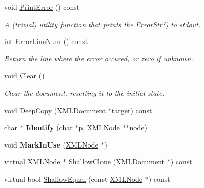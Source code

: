 \begin{DoxyCompactItemize}
\item 
\mbox{\label{classtinyxml2_1_1_x_m_l_document_a1d033945b42e125d933d6231e4571552}} 
void \mbox{\hyperlink{classtinyxml2_1_1_x_m_l_document_a1d033945b42e125d933d6231e4571552}{Print\+Error}} () const
\begin{DoxyCompactList}\small\item\em A (trivial) utility function that prints the \mbox{\hyperlink{classtinyxml2_1_1_x_m_l_document_ae97fff2402a0d01e0509c430b37996b3}{Error\+Str()}} to stdout. \end{DoxyCompactList}\item 
\mbox{\label{classtinyxml2_1_1_x_m_l_document_a57400f816dbe7799ece33615ead9ab76}} 
int \mbox{\hyperlink{classtinyxml2_1_1_x_m_l_document_a57400f816dbe7799ece33615ead9ab76}{Error\+Line\+Num}} () const
\begin{DoxyCompactList}\small\item\em Return the line where the error occured, or zero if unknown. \end{DoxyCompactList}\item 
\mbox{\label{classtinyxml2_1_1_x_m_l_document_a65656b0b2cbc822708eb351504178aaf}} 
void \mbox{\hyperlink{classtinyxml2_1_1_x_m_l_document_a65656b0b2cbc822708eb351504178aaf}{Clear}} ()
\begin{DoxyCompactList}\small\item\em Clear the document, resetting it to the initial state. \end{DoxyCompactList}\item 
void \mbox{\hyperlink{classtinyxml2_1_1_x_m_l_document_af592ffc91514e25a39664521ac83db45}{Deep\+Copy}} (\mbox{\hyperlink{classtinyxml2_1_1_x_m_l_document}{X\+M\+L\+Document}} $\ast$target) const
\item 
\mbox{\label{classtinyxml2_1_1_x_m_l_document_a25827d1bec509ad566a107e5853ed040}} 
char $\ast$ {\bfseries Identify} (char $\ast$p, \mbox{\hyperlink{classtinyxml2_1_1_x_m_l_node}{X\+M\+L\+Node}} $\ast$$\ast$node)
\item 
\mbox{\label{classtinyxml2_1_1_x_m_l_document_a95d28ecb4760a994556b0a51690b21be}} 
void {\bfseries Mark\+In\+Use} (\mbox{\hyperlink{classtinyxml2_1_1_x_m_l_node}{X\+M\+L\+Node}} $\ast$)
\item 
virtual \mbox{\hyperlink{classtinyxml2_1_1_x_m_l_node}{X\+M\+L\+Node}} $\ast$ \mbox{\hyperlink{classtinyxml2_1_1_x_m_l_document_aa37cc1709d7e1e988bc17dcfb24a69b8}{Shallow\+Clone}} (\mbox{\hyperlink{classtinyxml2_1_1_x_m_l_document}{X\+M\+L\+Document}} $\ast$) const
\item 
virtual bool \mbox{\hyperlink{classtinyxml2_1_1_x_m_l_document_a6fe5ef18699091844fcf64b56ffa5bf9}{Shallow\+Equal}} (const \mbox{\hyperlink{classtinyxml2_1_1_x_m_l_node}{X\+M\+L\+Node}} $\ast$) const
\end{DoxyCompactItemize}
